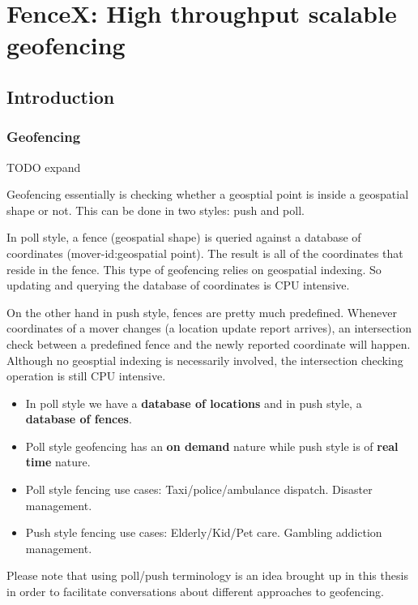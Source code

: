 \documentclass[a4]{report}
\begin{document}
    \part[FenceX]{FenceX: High throughput scalable geofencing}


    \chapter{Introduction}


    \section{Geofencing}
    TODO expand


    Geofencing essentially is checking whether a geosptial point is inside a geospatial shape or not. This can be done in two styles: push and poll.

    In poll style, a fence (geospatial shape) is queried against a database of coordinates (mover-id:geospatial point). The result is all of the coordinates that reside in the fence. This type of geofencing relies on geospatial indexing. So updating and querying the database of coordinates is CPU intensive.

    On the other hand in push style, fences are pretty much predefined. Whenever coordinates of a mover changes (a location update report arrives), an intersection check between a predefined fence and the newly reported coordinate will happen. Although no geosptial indexing is necessarily involved, the intersection checking operation is still CPU intensive.

    \begin{itemize}
        \item In poll style we have a \textbf{database of locations} and in push style, a \textbf{database of fences}.
        \item Poll style geofencing has an \textbf{on demand} nature while push style is of \textbf{real time} nature.
        \item Poll style fencing use cases: Taxi/police/ambulance dispatch. Disaster management.
        \item Push style fencing use cases: Elderly/Kid/Pet care. Gambling addiction management.
    \end{itemize}

    Please note that using poll/push terminology is an idea brought up in this thesis in order to facilitate conversations about different approaches to geofencing.
\end{document}
